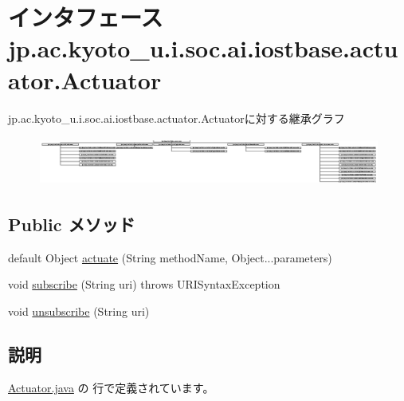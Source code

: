 \hypertarget{interfacejp_1_1ac_1_1kyoto__u_1_1i_1_1soc_1_1ai_1_1iostbase_1_1actuator_1_1_actuator}{\section{インタフェース jp.\-ac.\-kyoto\-\_\-u.\-i.\-soc.\-ai.\-iostbase.\-actuator.\-Actuator}
\label{interfacejp_1_1ac_1_1kyoto__u_1_1i_1_1soc_1_1ai_1_1iostbase_1_1actuator_1_1_actuator}
}
jp.\-ac.\-kyoto\-\_\-u.\-i.\-soc.\-ai.\-iostbase.\-actuator.\-Actuatorに対する継承グラフ\begin{figure}[H]
\begin{center}
\leavevmode
\includegraphics[height=1.604938cm]{interfacejp_1_1ac_1_1kyoto__u_1_1i_1_1soc_1_1ai_1_1iostbase_1_1actuator_1_1_actuator}
\end{center}
\end{figure}
\subsection*{Public メソッド}
\begin{DoxyCompactItemize}
\item 
default Object \hyperlink{interfacejp_1_1ac_1_1kyoto__u_1_1i_1_1soc_1_1ai_1_1iostbase_1_1actuator_1_1_actuator_a8937a9f8f0574ea09eeb4ec97de87b32}{actuate} (String method\-Name, Object...\-parameters)
\item 
void \hyperlink{interfacejp_1_1ac_1_1kyoto__u_1_1i_1_1soc_1_1ai_1_1iostbase_1_1actuator_1_1_actuator_a6b46e9b872c08ba82f32e1bd731c5424}{subscribe} (String uri)  throws U\-R\-I\-Syntax\-Exception
\item 
void \hyperlink{interfacejp_1_1ac_1_1kyoto__u_1_1i_1_1soc_1_1ai_1_1iostbase_1_1actuator_1_1_actuator_aa1a50552e3a9b5886527acac4983dcdf}{unsubscribe} (String uri)
\end{DoxyCompactItemize}


\subsection{説明}


 \hyperlink{_actuator_8java_source}{Actuator.\-java} の  行で定義されています。



